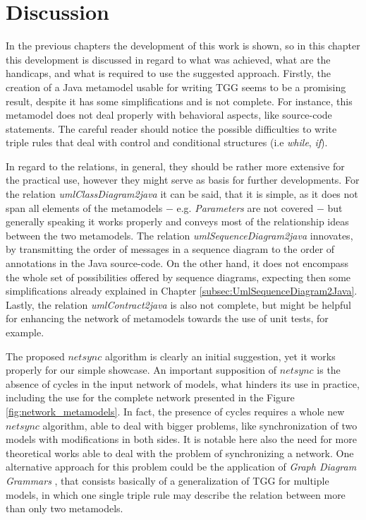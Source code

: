 \documentclass[tuberlin,cic,tc,english,noabntcite, oneside]{iiufrgs}
\begin{document}
\chapter{Discussion}
\label{chapter:discussion}

In the previous chapters the development of this work is shown, so in this chapter this development is discussed in regard to what was achieved, what are the handicaps, and what is required to use the suggested approach. Firstly, the creation of a Java metamodel usable for writing TGG seems to be a promising result, despite it has some simplifications and is not complete. For instance, this metamodel does not deal properly with behavioral aspects, like source-code statements. The careful reader should notice the possible difficulties to write triple rules that deal with control and conditional structures (i.e \emph{while}, \emph{if}).

In regard to the relations, in general, they should be rather more extensive for the practical use, however they might serve as basis for further developments. For the relation \emph{umlClassDiagram2java} it can be said, that it is simple, as it does not span all elements of the metamodels $-$ e.g. \emph{Parameters} are not covered $-$ but generally speaking it works properly and conveys most of the relationship ideas between the two metamodels. The relation \emph{umlSequenceDiagram2java} innovates, by transmitting the order of messages in a sequence diagram to the order of annotations in the Java source-code. On the other hand, it does not encompass the whole set of possibilities offered by sequence diagrams, expecting then some simplifications already explained in Chapter \ref{subsec:UmlSequenceDiagram2Java}. Lastly, the relation \emph{umlContract2java} is also not complete, but might be helpful for enhancing the network of metamodels towards the use of unit tests, for example.

The proposed $netsync$ algorithm is clearly an initial suggestion, yet it works properly for our simple showcase. An important supposition of $netsync$ is the absence of cycles in the input network of models, what hinders its use in practice, including the use for the complete network presented in the Figure \ref{fig:network_metamodels}. In fact, the presence of cycles requires a whole new $netsync$ algorithm, able to deal with bigger problems, like synchronization of two models with modifications in both sides. It is notable here also the need for more theoretical works able to deal with the problem of synchronizing a network. One alternative approach for this problem could be the application of \emph{Graph Diagram Grammars} \citep{trollmann2015extending}, that consists basically of a generalization of TGG for multiple models, in which one single triple rule may describe the relation between more than only two metamodels.
\end{document}
